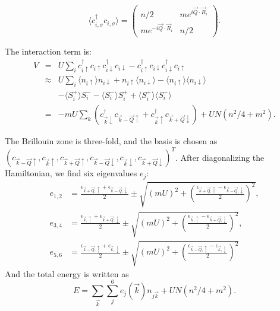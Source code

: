 \documentclass[%
reprint,
superscriptaddress,
twocolumn,
 amsmath,amssymb,
 aps,
 prb,
]{revtex4-2}
\begin{document}
\begin{equation}
\langle c_{i,\sigma}^\dagger c_{i,\sigma} \rangle =\left(\begin{array}{cc}
	n/2 & me^{i\vec{Q}\cdot\vec{R}_i} \\ me^{-i\vec{Q}\cdot\vec{R}_i} & n/2\end{array}\right).
\end{equation}

The interaction term is:
\begin{eqnarray}
	V &=& U\sum_ic_{i\uparrow}^\dagger c_{i\uparrow}c_{i\downarrow}^\dagger c_{i\downarrow}-c_{i\uparrow}^\dagger c_{i\downarrow}c_{i\downarrow}^\dagger c_{i\uparrow}\\
	&\approx& U \sum_i  \langle n_{i\uparrow}\rangle n_{i\downarrow}+n_{i\uparrow}\langle n_{i\downarrow}\rangle -\langle n_{i\uparrow}\rangle \langle n_{i\downarrow}\rangle\nonumber\\
	&& -\langle S_i^+\rangle S_i^--\langle S_i^-\rangle S_i^++\langle S_i^+\rangle \langle S_i^-\rangle\nonumber\\
	&=& -mU\sum_{k}(c_{\vec{k}\downarrow}^\dagger c_{\vec{k}-\vec{Q}\uparrow}+c_{\vec{k}\uparrow}^\dagger c_{\vec{k}+\vec{Q}\downarrow})+ UN(n^2/4+m^2).\nonumber
\end{eqnarray}

The Brillouin zone is three-fold, and the basis is chosen as $(c_{\vec{k}-\vec{Q}\uparrow},c_{\vec{k}\uparrow}, c_{\vec{k}+\vec{Q}\uparrow},c_{\vec{k}-\vec{Q}\downarrow},c_{\vec{k}\downarrow},c_{\vec{k}+\vec{Q}\downarrow})^T$. After diagonalizing the Hamiltonian, we find six eigenvalues $e_j$:
\begin{align}\label{eq1}
	e_{1,2}&=\frac{\epsilon_{\vec{k}+\vec{Q},\uparrow}+\epsilon_{\vec{k}-\vec{Q},\downarrow}}{2}\pm\sqrt{(mU)^{2}+(\frac{\epsilon_{\vec{k}+\vec{Q},\uparrow}-\epsilon_{\vec{k}-\vec{Q},\downarrow}}{2})^{2}},\nonumber\\
	e_{3,4}&=\frac{\epsilon_{\vec{k},\uparrow}+\epsilon_{\vec{k}+\vec{Q},\downarrow}}{2}\pm\sqrt{(mU)^{2}+(\frac{\epsilon_{\vec{k},\uparrow}-\epsilon_{\vec{k}+\vec{Q},\downarrow}}{2})^{2}},\nonumber\\
	e_{5,6}&=\frac{\epsilon_{\vec{k}-\vec{Q},\uparrow}+\epsilon_{\vec{k},\downarrow}}{2}\pm\sqrt{(mU)^{2}+(\frac{\epsilon_{\vec{k}-\vec{Q},\uparrow}-\epsilon_{\vec{k},\downarrow}}{2})^{2}}
\end{align} 
And the total energy is written as
\begin{equation}
	E=\sum_{\vec{k}}\sum_j^6e_j(\vec{k})n_{j\vec{k}}+UN(n^2/4+m^2).
\end{equation}




\nocite{*}

\end{document}
